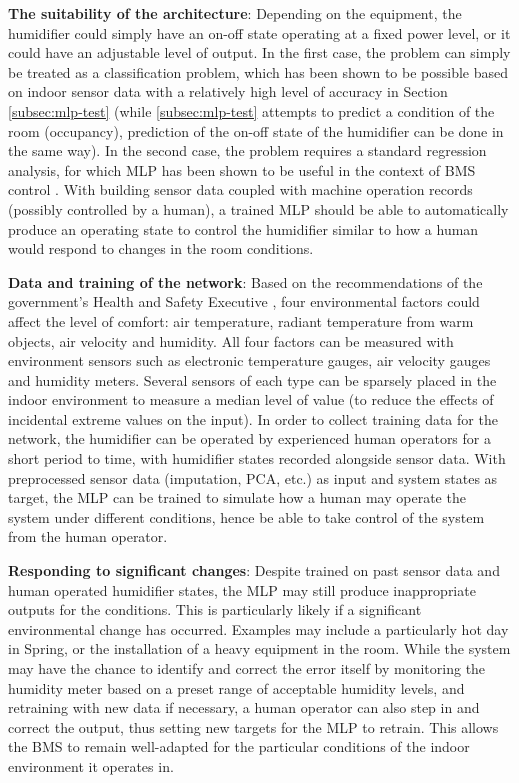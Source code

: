 \documentclass[10pt, oneside]{article}
\begin{document}
\textbf{The suitability of the architecture}: Depending on the equipment, the humidifier could simply have an on-off state operating at a fixed power level, or it could have an adjustable level of output. In the first case, the problem can simply be treated as a classification problem, which has been shown to be possible based on indoor sensor data with a relatively high level of accuracy in Section \ref{subsec:mlp-test} (while \ref{subsec:mlp-test} attempts to predict a condition of the room (occupancy), prediction of the on-off state of the humidifier can be done in the same way). In the second case, the problem requires a standard regression analysis, for which MLP has been shown to be useful in the context of BMS control \cite[Sec. 3.1]{kusiak2011multi}. With building sensor data coupled with machine operation records (possibly controlled by a human), a trained MLP should be able to automatically produce an operating state to control the humidifier similar to how a human would respond to changes in the room conditions.

\textbf{Data and training of the network}: Based on the recommendations of the government's Health and Safety Executive \cite{humidity-factors}, four environmental factors could affect the level of comfort: air temperature, radiant temperature from warm objects, air velocity and humidity. All four factors can be measured with environment sensors such as electronic temperature gauges, air velocity gauges and humidity meters. Several sensors of each type can be sparsely placed in the indoor environment to measure a median level of value (to reduce the effects of incidental extreme values on the input). In order to collect training data for the network, the humidifier can be operated by experienced human operators for a short period to time, with humidifier states recorded alongside sensor data. With preprocessed sensor data (imputation, PCA, etc.) as input and system states as target, the MLP can be trained to simulate how a human may operate the system under different conditions, hence be able to take control of the system from the human operator. 

\textbf{Responding to significant changes}: Despite trained on past sensor data and human operated humidifier states, the MLP may still produce inappropriate outputs for the conditions. This is particularly likely if a significant environmental change has occurred. Examples may include a particularly hot day in Spring, or the installation of a heavy equipment in the room. While the system may have the chance to identify and correct the error itself by monitoring the humidity meter based on a preset range of acceptable humidity levels, and retraining with new data if necessary, a human operator can also step in and correct the output, thus setting new targets for the MLP to retrain. This allows the BMS to remain well-adapted for the particular conditions of the indoor environment it operates in.
\end{document}

